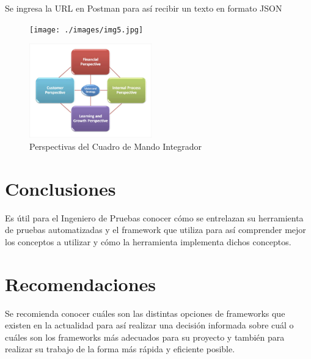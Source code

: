\documentclass[letterpaper, 12pt, spanish]{article}
\begin{document}
Se ingresa la URL en Postman para así recibir un texto en formato JSON

\begin{figure}[H]
	\begin{center}
		\texttt{[image: ./images/img5.jpg]}
		\caption{}
	\end{center}
\end{figure}



\begin{figure}[H]
\begin{center}
  \includegraphics[width=200px]{./images/bsc1.jpg}
  \caption{Perspectivas del Cuadro de Mando Integrador}
\end{center}
\end{figure}



\section{Conclusiones}
Es útil para el Ingeniero de Pruebas conocer cómo se entrelazan su herramienta de pruebas automatizadas y el framework que utiliza para así comprender mejor los conceptos a utilizar y cómo la herramienta implementa dichos conceptos.

\section{Recomendaciones}
Se recomienda  conocer cuáles son las distintas opciones de frameworks que existen en la actualidad para así realizar una decisión informada sobre cuál o cuáles son los frameworks más adecuados para su proyecto y también para realizar su trabajo de la forma más rápida y eficiente posible.
\end{document}
